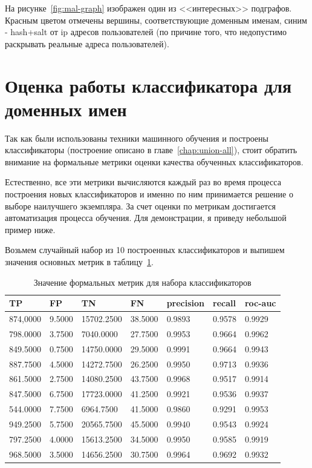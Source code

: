 \documentclass[a4paper,14pt]{extreport} %
\begin{document}
На рисунке~\ref{fig:mal-graph} изображен один из <<интересных>> подграфов. Красным цветом отмечены вершины, соответствующие доменным именам, синим - hash+salt от ip адресов пользователей (по причине того, что недопустимо раскрывать реальные адреса пользователей). 

\section{Оценка работы классификатора для доменных имен}
Так как были использованы техники машинного обучения и построены классификаторы (построение описано в главе~\ref{chap:union-all}), стоит обратить внимание на формальные метрики оценки качества обученных классификаторов.

Естественно, все эти метрики вычисляются каждый раз во время процесса построения новых классификаторов и именно по ним принимается решение о выборе наилучшего экземпляра. За счет оценки по метрикам достигается автоматизация процесса обучения. Для демонстрации, я приведу небольшой пример ниже.

Возьмем случайный набор из 10 построенных классификаторов и выпишем значения основных метрик в таблицу~\ref{tab:metr}.

\begin{table}[H]
\centering
\caption{Значение формальных метрик для набора классификаторов}
\label{tab:metr}
	\begin{tabular}{ |l|l|l|l|l|l|l|}
		\hline
		TP       & FP     & TN         & FN      & precision & recall & roc-auc \\ \hline
		874,0000 & 9.5000 & 15702.2500 & 38.5000 & 0.9893    & 0.9578 & 0.9929  \\ \hline
		798.0000 & 3.7500 & 7040.0000  & 27.7500 & 0.9953    & 0.9664 & 0.9962  \\ \hline
		849.5000 & 0.7500 & 14750.0000 & 29.5000 & 0.9991    & 0.9664 & 0.9943  \\ \hline
		887.7500 & 4.5000 & 14272.7500 & 26.2500 & 0.9950    & 0.9713 & 0.9936  \\ \hline
		861.5000 & 2.7500 & 14080.2500 & 43.7500 & 0.9968    & 0.9517 & 0.9914  \\ \hline
		847.5000 & 6.7500 & 17723.0000 & 41.2500 & 0.9921    & 0.9536 & 0.9937  \\ \hline
		544.0000 & 7.7500 & 6964.7500  & 41.5000 & 0.9860    & 0.9291 & 0.9953  \\ \hline
		949.2500 & 5.7500 & 20565.7500 & 45.5000 & 0.9940    & 0.9543 & 0.9924  \\ \hline
		797.2500 & 4.0000 & 15613.2500 & 34.5000 & 0.9950    & 0.9585 & 0.9919  \\ \hline
		968.5000 & 3.5000 & 14656.2500 & 30.7500 & 0.9964    & 0.9692 & 0.9932  \\ \hline
	\end{tabular}
\end{table}
\end{document}
